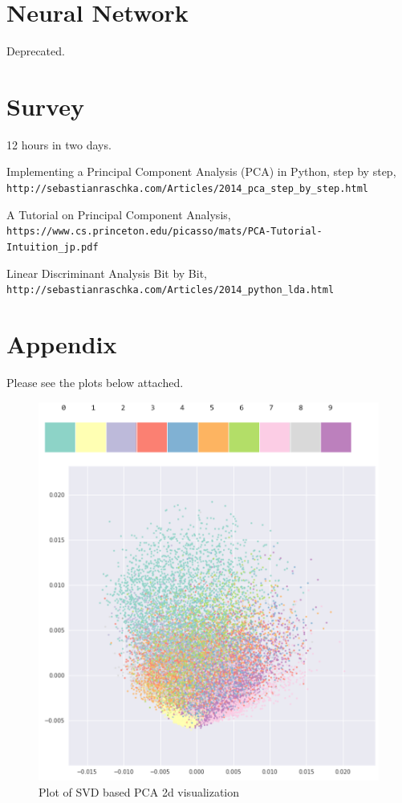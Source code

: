 \documentclass[11pt, oneside]{article}
\begin{document}
\section{Neural Network}
Deprecated.

\section{Survey}
12 hours in two days.


\begin{thebibliography}{9}
Implementing a Principal Component Analysis (PCA) in Python, step by step,
\\\texttt{http://sebastianraschka.com/Articles/2014\_pca\_step\_by\_step.html}

A Tutorial on Principal Component Analysis,
\\\texttt{https://www.cs.princeton.edu/picasso/mats/PCA-Tutorial-Intuition\_jp.pdf}

Linear Discriminant Analysis Bit by Bit,\\
\texttt{http://sebastianraschka.com/Articles/2014\_python\_lda.html}

\end{thebibliography}

\section{Appendix}
Please see the plots below attached.

\begin{figure}[h]
\centering
\includegraphics{./pics/svd_pca_2d.PNG}
\caption{Plot of SVD based PCA 2d visualization}
\end{figure}
\end{document}
